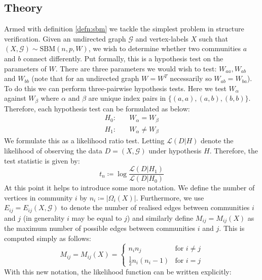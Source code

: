 \documentclass[]{article}
\newcommand{\Gcal}{\mathcal{G}}
\newcommand{\lik}{\mathcal{L}}
\begin{document}
\begin{multicols*}{2}
\subsection{Theory}

Armed with definition \ref{defn:sbm} we tackle the simplest problem in structure verification. Given an undirected graph $\Gcal$ and vertex-labels $X$ such that $(X, \Gcal) \sim \textrm{SBM}(n, p, W)$, we wish to determine whether two communities $a$ and $b$ connect differently. Put formally, this is a hypothesis test on the parameters of $W$. There are three parameters we would wish to test: $W_{aa}, W_{ab}$ and $W_{bb}$ (note that for an undirected graph $W = W^T$ necessarily so $W_{ab} = W_{ba}$). To do this we can perform three-pairwise hypothesis tests. Here we test $W_{\alpha}$ against $W_{\beta}$ where $\alpha$ and $\beta$ are unique index pairs in $\{(a,a), (a, b), (b,b)\}$. Therefore, each hypothesis test can be formulated as below:
%
\begin{equation}
\begin{aligned}
	H_0:& \quad W_{\alpha} = W_{\beta} \\
	H_1:& \quad W_{\alpha} \neq W_{\beta}
\end{aligned}
\end{equation}
%
We formulate this as a likelihood ratio test. Letting $\lik(D | H)$ denote the likelihood of observing the data $D = (X, \Gcal)$ under hypothesis $H$. Therefore, the test statistic is given by:
%
\begin{equation}
	t_n \coloneqq \log \frac{\lik(D | H_1)}{\lik(D | H_0)}
	\label{eqn:test-statistic-start}
\end{equation}
%
At this point it helps to introduce some more notation. We define the number of vertices in community $i$ by $n_i \coloneqq |\Omega_i(X)|$. Furthermore, we use $E_{ij} = E_{ij}(X, \Gcal)$ to denote the number of realised edges between communities $i$ and $j$ (in generality $i$ may be equal to $j$) and similarly define $M_{ij} = M_{ij}(X)$ as the maximum number of possible edges between communities $i$ and $j$. This is computed simply as follows:
%
\begin{equation}
	M_{ij} = M_{ij} (X) = \begin{cases}
		n_i n_j &\text{for } i \neq j \\
		\frac{1}{2}n_i (n_i - 1) &\text{for } i = j
	\end{cases}
\end{equation}
%
With this new notation, the likelihood function can be written explicitly:

\end{multicols*}
\end{document}
